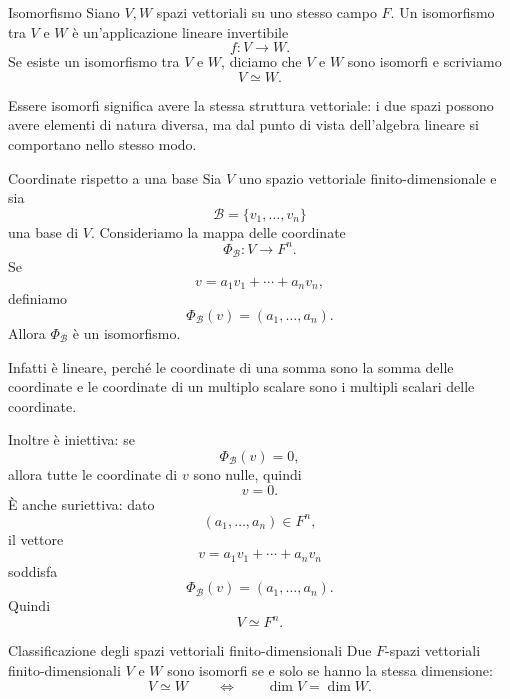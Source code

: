\documentclass[a4paper]{article}
\begin{document}
\begin{snippetdefinition}{Isomorfismo}
    Siano \(V,W\) spazi vettoriali su uno stesso campo \(F\). Un isomorfismo tra \(V\) e \(W\) è un'applicazione lineare invertibile
    \[
        f:V\to W.
    \]
    Se esiste un isomorfismo tra \(V\) e \(W\), diciamo che \(V\) e \(W\) sono isomorfi e scriviamo
    \[
        V\simeq W.
    \]
\end{snippetdefinition}

Essere isomorfi significa avere la stessa struttura vettoriale: i due spazi possono avere elementi di natura diversa, ma dal punto di vista dell'algebra lineare si comportano nello stesso modo.

\begin{snippetexample}{Coordinate rispetto a una base}
    Sia \(V\) uno spazio vettoriale finito-dimensionale e sia
    \[
        \mathcal{B}=\{v_1,\ldots,v_n\}
    \]
    una base di \(V\). Consideriamo la mappa delle coordinate
    \[
        \Phi_{\mathcal{B}}:V\to F^n.
    \]
    Se
    \[
        v=a_1v_1+\cdots+a_nv_n,
    \]
    definiamo
    \[
        \Phi_{\mathcal{B}}(v)=(a_1,\ldots,a_n).
    \]
    Allora \(\Phi_{\mathcal{B}}\) è un isomorfismo.

    Infatti è lineare, perché le coordinate di una somma sono la somma delle coordinate e le coordinate di un multiplo scalare sono i multipli scalari delle coordinate.

    Inoltre è iniettiva: se
    \[
        \Phi_{\mathcal{B}}(v)=0,
    \]
    allora tutte le coordinate di \(v\) sono nulle, quindi
    \[
        v=0.
    \]
    È anche suriettiva: dato
    \[
        (a_1,\ldots,a_n)\in F^n,
    \]
    il vettore
    \[
        v=a_1v_1+\cdots+a_nv_n
    \]
    soddisfa
    \[
        \Phi_{\mathcal{B}}(v)=(a_1,\ldots,a_n).
    \]
    Quindi
    \[
        V\simeq F^n.
    \]
\end{snippetexample}

\begin{snippettheorem}{Classificazione degli spazi vettoriali finito-dimensionali}
    Due \(F\)-spazi vettoriali finito-dimensionali \(V\) e \(W\) sono isomorfi se e solo se hanno la stessa dimensione:
    \[
        V\simeq W
        \qquad\Longleftrightarrow\qquad
        \dim V=\dim W.
    \]
\end{snippettheorem}
\end{document}
